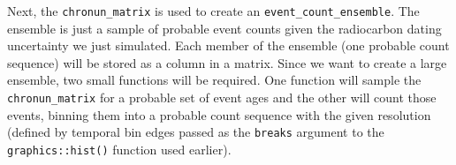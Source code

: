 \documentclass[]{article}
\newenvironment{Shaded}{\begin{snugshade}}{\end{snugshade}}
\newcommand{\KeywordTok}[1]{\textcolor[rgb]{0.13,0.29,0.53}{\textbf{#1}}}
\newcommand{\DataTypeTok}[1]{\textcolor[rgb]{0.13,0.29,0.53}{#1}}
\newcommand{\DecValTok}[1]{\textcolor[rgb]{0.00,0.00,0.81}{#1}}
\newcommand{\FloatTok}[1]{\textcolor[rgb]{0.00,0.00,0.81}{#1}}
\newcommand{\StringTok}[1]{\textcolor[rgb]{0.31,0.60,0.02}{#1}}
\newcommand{\ControlFlowTok}[1]{\textcolor[rgb]{0.13,0.29,0.53}{\textbf{#1}}}
\newcommand{\OperatorTok}[1]{\textcolor[rgb]{0.81,0.36,0.00}{\textbf{#1}}}
\newcommand{\NormalTok}[1]{#1}
\begin{document}
\begin{Shaded}
\end{Shaded}

Next, the \texttt{chronun\_matrix} is used to create an
\texttt{event\_count\_ensemble}. The ensemble is just a sample of
probable event counts given the radiocarbon dating uncertainty we just
simulated. Each member of the ensemble (one probable count sequence)
will be stored as a column in a matrix. Since we want to create a large
ensemble, two small functions will be required. One function will sample
the \texttt{chronun\_matrix} for a probable set of event ages and the
other will count those events, binning them into a probable count
sequence with the given resolution (defined by temporal bin edges passed
as the \texttt{breaks} argument to the \texttt{graphics::hist()}
function used earlier).
\end{document}
